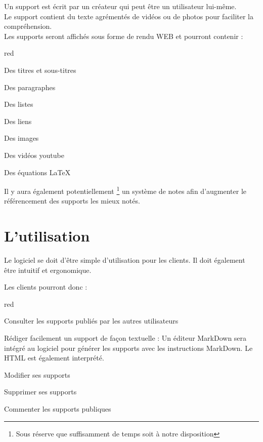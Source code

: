 {Un support est écrit par un créateur qui peut être un utilisateur lui-même.\\ Le support contient du texte agrémentés de vidéos ou de photos pour faciliter la compréhension. \\
Les supports seront affichés sous forme de rendu WEB et pourront contenir :

  \begin{items}{red}{\Circle}
    \item Des titres et sous-titres
    \item Des paragraphes
    \item Des listes
    \item Des liens
    \item Des images
    \item Des vidéos youtube
    \item Des équations \LaTeX
 \end{items}
 
 
 Il y aura également potentiellement \footnote{Sous réserve que suffisamment de temps soit à notre disposition} un système de notes afin d’augmenter le référencement des supports les mieux notés. 

\section{L'utilisation}

Le logiciel se doit d'être simple d'utilisation pour les clients. Il doit également être intuitif et ergonomique.

Les clients pourront donc : 

  \begin{items}{red}{\Circle}
    \item Consulter les supports publiés par les autres utilisateurs
    \item Rédiger facilement un support de façon textuelle : Un éditeur MarkDown sera intégré au logiciel pour générer les supports avec les instructions MarkDown. Le HTML est également interprété.
    \item Modifier ses supports
    \item Supprimer ses supports
    \item Commenter les supports publiques
 \end{items}


}
